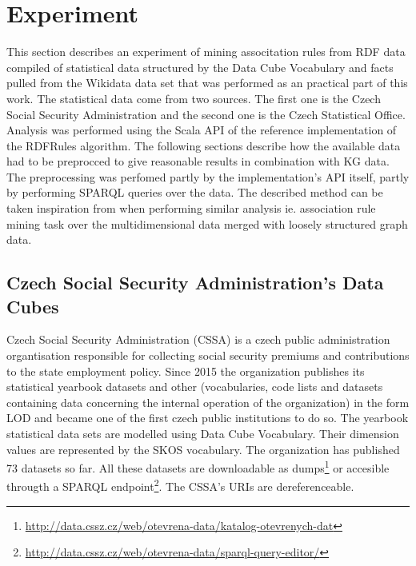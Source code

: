 \chapter{Experiment\label{experiment}}


This section describes an experiment of mining associtation rules from RDF data compiled of statistical data structured by the Data Cube Vocabulary and facts pulled from the Wikidata data set that was performed as an practical part of this work. The statistical data come from two sources. The first one is the Czech Social Security Administration and the second one is the Czech Statistical Office. Analysis was performed using the Scala API of the reference implementation of the RDFRules algorithm. The following sections describe how the available data had to be preprocced to give reasonable results in combination with KG data. The preprocessing was perfomed partly by the implementation's API itself, partly by performing SPARQL queries over the data. The described method can be taken inspiration from when performing similar analysis ie. association rule mining task over the multidimensional data merged with loosely structured graph data. 

\section{Czech Social Security Administration's Data Cubes\label{cssa}}

Czech Social Security Administration (CSSA) is a czech public administration organtisation responsible for collecting social security premiums and contributions to the state employment policy. Since 2015 the organization publishes its statistical yearbook datasets and other (vocabularies, code lists and datasets containing data concerning the internal operation of the organization) in the form LOD and became one of the first czech public institutions to do so. The yearbook statistical data sets are modelled using Data Cube Vocabulary. Their dimension values are represented by the SKOS vocabulary. The organization has published 73 datasets so far. All these datasets are downloadable as dumps\footnote{\href{http://data.cssz.cz/web/otevrena-data/katalog-otevrenych-dat}{http://data.cssz.cz/web/otevrena-data/katalog-otevrenych-dat}} or accesible througth a SPARQL endpoint\footnote{\href{http://data.cssz.cz/web/otevrena-data/sparql-query-editor/}{http://data.cssz.cz/web/otevrena-data/sparql-query-editor/}}. The CSSA's URIs are dereferenceable.

